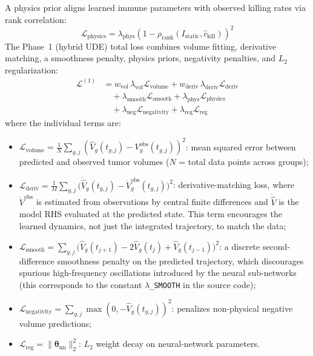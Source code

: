 \documentclass{juliacon}
\begin{document}
A physics prior aligns learned immune parameters with observed killing rates via rank correlation:
\begin{equation}
\mathcal{L}_{\text{physics}} = \lambda_{\text{phys}}\left(1 - \rho_{\text{rank}}(I_{\text{static}}, \hat{c}_{\text{kill}})\right)^2
\label{eq:physics_prior}
\end{equation}
The Phase~1 (hybrid UDE) total loss combines volume fitting, derivative matching, a smoothness penalty, physics priors, negativity penalties, and $L_2$ regularization:
\begin{align}
\mathcal{L}^{(1)} &= w_{\text{vol}}\,\lambda_{\text{vol}} \mathcal{L}_{\text{volume}}
+ w_{\text{deriv}}\,\lambda_{\text{deriv}} \mathcal{L}_{\text{deriv}} \nonumber\\
&\quad + \lambda_{\text{smooth}} \mathcal{L}_{\text{smooth}}
+ \lambda_{\text{phys}} \mathcal{L}_{\text{physics}} \nonumber\\
&\quad + \lambda_{\text{neg}} \mathcal{L}_{\text{negativity}} + \lambda_{\text{reg}} \mathcal{L}_{\text{reg}}
\label{eq:total_loss}
\end{align}
where the individual terms are:
\begin{itemize}[leftmargin=*]
  \item $\mathcal{L}_{\text{volume}} = \frac{1}{N}\sum_{g,j}(\hat{V}_g(t_{g,j}) - V^{\text{obs}}_g(t_{g,j}))^2$: mean squared error between predicted and observed tumor volumes ($N$ = total data points across groups);
  \item $\mathcal{L}_{\text{deriv}} = \frac{1}{M}\sum_{g,j}\bigl(\dot{\hat{V}}_g(t_{g,j}) - \dot{V}^{\text{obs}}_g(t_{g,j})\bigr)^2$: derivative-matching loss, where $\dot{V}^{\text{obs}}$ is estimated from observations by central finite differences and $\dot{\hat{V}}$ is the model RHS evaluated at the predicted state. This term encourages the learned dynamics, not just the integrated trajectory, to match the data;
  \item $\mathcal{L}_{\text{smooth}} = \sum_{g,j}\bigl(\hat{V}_g(t_{j+1}) - 2\hat{V}_g(t_j) + \hat{V}_g(t_{j-1})\bigr)^2$: a discrete second-difference smoothness penalty on the predicted trajectory, which discourages spurious high-frequency oscillations introduced by the neural sub-networks (this corresponds to the constant \texttt{$\lambda$\_SMOOTH} in the source code);
  \item $\mathcal{L}_{\text{negativity}} = \sum_{g,j}\max(0, -\hat{V}_g(t_{g,j}))^2$: penalizes non-physical negative volume predictions;
  \item $\mathcal{L}_{\text{reg}} = \|\boldsymbol{\theta}_{\text{nn}}\|_2^2$: $L_2$ weight decay on neural-network parameters.
\end{itemize}
\end{document}
